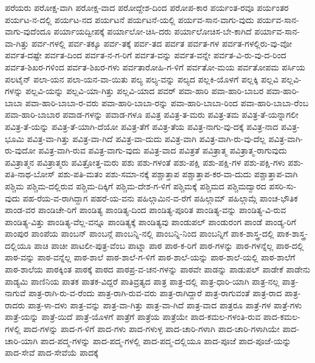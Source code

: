 {ಪರೆಯರು
ಪರೋಕ್ಷ-ವಾಗಿ
ಪರೋಕ್ಷ-ವಾದ
ಪರೋದ್ದೇಶ-ದಿಂದ
ಪರೋಪ-ಕಾರ
ಪರ್ಯಂತ-ರವೂ
ಪರ್ಯಂತರ
ಪರ್ಯಟ-ನ-ದಲ್ಲಿ
ಪರ್ಯಟ-ನದ
ಪರ್ಯಟನೆ
ಪರ್ಯಟನೆ-ಯಲ್ಲಿ
ಪರ್ಯವ-ಸಾನ-ವಾಗು-ವುದು
ಪರ್ಯವ-ಸಾನ-ವಾಗು-ವುದೆಂದೂ
ಪರ್ಯಾಯದ್ವೀಪಕ್ಕೆ
ಪರ್ಯಾಲೋ-ಚಿಸಿ-ದರು
ಪರ್ಯಾಲೋಚಿಸ-ಬೇ-ಕಾಗಿದೆ
ಪರ್ಯಾವ-ಸಾನ-ವಾ-ಗಿತ್ತು
ಪರ್ವ-ಗಳಲ್ಲಿ
ಪರ್ವ-ತಕ್ಕೂ
ಪರ್ವ-ತಕ್ಕೆ
ಪರ್ವ-ತದ
ಪರ್ವತ
ಪರ್ವತ-ಗಳ
ಪರ್ವತ-ಗಳಲ್ಲಿರು-ವು-ವೋ
ಪರ್ವತ-ದಷ್ಟೇ
ಪರ್ವತ-ದಿಂದ
ಪರ್ವತ-ನ-ಗ-ರಿಗೆ
ಪರ್ವತ-ವನ್ನು
ಪರ್ವತ-ವನ್ನೇ
ಪರ್ವತ-ವಿ-ರು-ವು-ದ-ರಿಂದ
ಪರ್ವತ-ಶಿಖರ-ಗಳಿಂದ
ಪರ್ವತ-ಶಿಖರ-ಗಳು
ಪರ್ವತಾರೋಹಿ-ಗ-ಳಿಗೆ
ಪರ್ವತೋ-ಮಯ
ಪರ್ವತೋಪಮ
ಪರ್ಸಿಯ
ಪಲಟೈನ್
ಪಲಾ-ಯನ
ಪಲಾ-ಯನ-ವಾ-ಯಿತು
ಪಲ್ಯ
ಪಲ್ಯ-ವನ್ನು
ಪಲ್ಯದ
ಪಲ್ಲಕಿ-ಯೊಳಗೆ
ಪಲ್ಲಕ್ಕಿ
ಪಲ್ಲವಿ
ಪಲ್ಲವಿ-ಗಳನ್ನು
ಪಲ್ಲವಿ-ಯನ್ನು
ಪಲ್ಲವಿ-ಯಾ-ಗಿತ್ತು
ಪಲ್ಲವಿ-ಯಾದ
ಪವರ್
ಪವಾ-ಹಾರಿ
ಪವಾ-ಹಾರಿ-ಬಾಬರ
ಪವಾ-ಹಾರಿ-ಬಾಬಾ
ಪವಾ-ಹಾರಿ-ಬಾಬಾ-ರ-ವರು
ಪವಾ-ಹಾರಿ-ಬಾಬಾ-ರನ್ನು
ಪವಾ-ಹಾರಿ-ಬಾಬಾ-ರಿಂದ
ಪವಾ-ಹಾರಿ-ಬಾಬಾ-ರೆಂಬ
ಪವಾ-ಹಾರಿ-ಬಾಬಾರ
ಪವಾಡ-ಗಳನ್ನು
ಪವಾಡ-ಗಳೂ
ಪವಿತ್ರ
ಪವಿತ್ರ-ತ-ಮರು
ಪವಿತ್ರ-ತಮ
ಪವಿತ್ರ-ತೆ-ಯನ್ನಾಗಲೀ
ಪವಿತ್ರ-ತೆ-ಯನ್ನು
ಪವಿತ್ರ-ತೆ-ಯಾಗಿ-ದೆಯೋ
ಪವಿತ್ರ-ತೆಗೆ
ಪವಿತ್ರ-ತೆಯ
ಪವಿತ್ರ-ನಾಗು-ವು-ದಕ್ಕೆ
ಪವಿತ್ರ-ನಾದ
ಪವಿತ್ರ-ಭೂಮಿ
ಪವಿತ್ರ-ವಾ-ಗಿತ್ತು
ಪವಿತ್ರ-ವಾ-ಗಿದೆ
ಪವಿತ್ರ-ವಾ-ದುದು
ಪವಿತ್ರ-ವಾಗಿ
ಪವಿತ್ರ-ವಾಗಿ-ರು-ವು-ದೆಲ್ಲ
ಪವಿತ್ರ-ವಾಗಿ-ರು-ವುದೋ
ಪವಿತ್ರ-ವಾಗಿ-ರುವ
ಪವಿತ್ರ-ವಾಗು-ವುದು
ಪವಿತ್ರ-ವಾದ
ಪವಿತ್ರತೆ
ಪವಿತ್ರಾತ್ಮ
ಪವಿತ್ರಾತ್ಮ-ರಾಗುವುದು
ಪವಿತ್ರಾತ್ಮನ
ಪವಿತ್ರಾತ್ಮರು
ಪವಿತ್ರೋತ್ತ-ಮರು
ಪಶು
ಪಶು-ಗಳಂತೆ
ಪಶು-ಪಕ್ಷಿ
ಪಶು-ಪಕ್ಷಿ-ಗಳ
ಪಶು-ಪಕ್ಷಿ-ಗಳು
ಪಶು-ಪತಿ-ನಾಥ-ಬೋಸ್
ಪಶು-ಪತಿ-ಮತಂ
ಪಶು-ಸಮಾ-ನಕ್ಕೆ
ಪಶ್ಚಾತ್ತಾಪ
ಪಶ್ಚಾತ್ತಾಪ-ಕರ-ವಾ-ದುದು
ಪಶ್ಚಾತ್ತಾಪ-ವಾಗಿ
ಪಶ್ಚಿಮ
ಪಶ್ಚಿಮ-ದಲ್ಲಿರುವ
ಪಶ್ಚಿಮ-ದಿಕ್ಕಿಗೆ
ಪಶ್ಚಿಮ-ದೇಶ-ಗ-ಳಿಗೆ
ಪಶ್ಚಿಮಕ್ಕೆ
ಪಶ್ಚಿಮದ
ಪಶ್ಚಿಮದ್ವಾರದ
ಪಸರಿ-ಸು-ವುದು
ಪಹ-ರೆಯ-ವ-ರಾಗಿದ್ದಾಗ
ಪಹರೆ-ಯ-ವನು
ಪಹಿಲ್ಗಾಮಿನ-ವ-ರೆಗೆ
ಪಹಿಲ್ಗಾಮ್
ಪಹಿಲ್ಗಾಮ್ಗೆ
ಪಾಂಚ-ಭೌತಿಕ
ಪಾಂಡ-ವರ
ಪಾಂಡಿಚೇ-ರಿಗೆ
ಪಾಂಡಿತ್ಯ
ಪಾಂಡಿತ್ಯ-ದಿಂದ
ಪಾಂಡಿತ್ಯ-ಪೂರಿತ
ಪಾಂಡಿತ್ಯ-ವನ್ನು
ಪಾಂಡಿತ್ಯ-ವಿ-ರುವ
ಪಾಂಡಿತ್ಯ-ವಿತ್ತು
ಪಾಂಡಿತ್ಯ-ವೆಲ್ಲ-ವನ್ನೂ
ಪಾಂಡಿತ್ಯಕ್ಕೆ
ಪಾಂಡಿತ್ಯವು
ಪಾಂಡುಪಲ್
ಪಾಂಡುರಂಗ
ಪಾಂಡೆ
ಪಾಂಡ್ಯ-ರಿಗೆ
ಪಾಂಪುರ
ಪಾಂಪೆಯ
ಪಾಂಬನ್
ಪಾಂಬನ್ಗೆ
ಪಾಂಬನ್ನಿ-ನಲ್ಲಿ
ಪಾಂಬನ್ನಿ-ನಿಂದ
ಪಾಂಬನ್ನಿಗೆ
ಪಾಕ-ಶಾಸ್ತ್ರ-ದಲ್ಲಿ
ಪಾಕ-ಶಾಸ್ತ್ರ-ದಲ್ಲಿಯೂ
ಪಾಚಿ
ಪಾಚೀ
ಪಾಟಲೀ-ಪುತ್ರ-ವೆಂಬ
ಪಾಟ್ನಾ
ಪಾಠ
ಪಾಠ-ಕ-ರಿಗೆ
ಪಾಠ-ಗಳನ್ನು
ಪಾಠ-ಗಳನ್ನೆಲ್ಲ
ಪಾಠ-ದಲ್ಲಿ
ಪಾಠ-ವನ್ನು
ಪಾಠ-ವನ್ನೆಲ್ಲ
ಪಾಠ-ಶಾಲೆ
ಪಾಠ-ಶಾಲೆ-ಗ-ಳಿಗೆ
ಪಾಠ-ಶಾಲೆ-ಯನ್ನು
ಪಾಠ-ಶಾಲೆ-ಯಲ್ಲಿ
ಪಾಠ-ಶಾಲೆಗೆ
ಪಾಠ-ಶಾಲೆಯ
ಪಾಠಕ್ಕಿಂತ
ಪಾಠಕ್ಕೆ
ಪಾಠದ
ಪಾಠಪ್ರ-ವ-ಚನ-ಗಳನ್ನು
ಪಾಠವೇ
ಪಾಡನ್ನು
ಪಾಡುಪಲ್
ಪಾಡೇಕೆ
ಪಾಡೇನು
ಪಾಡ್ಯಮಿ
ಪಾಣಿನಿಯ
ಪಾತಕ
ಪಾತಕ-ವಿದ್ದರೆ
ಪಾತಿವ್ರತ್ಯದ
ಪಾತ್ರ
ಪಾತ್ರ-ದಲ್ಲಿ
ಪಾತ್ರ-ಧಾರಿ-ಯಾಗಿ
ಪಾತ್ರ-ನಲ್ಲ
ಪಾತ್ರ-ನಾಗುವೆ
ಪಾತ್ರ-ರಾಗಿ-ರು-ವ-ರೆಂದು
ಪಾತ್ರ-ರಾಗಿ-ರುವ-ವರು
ಪಾತ್ರ-ರಾಗಿದ್ದಾರೆ
ಪಾತ್ರ-ರಾಗುವಂತೆ
ಪಾತ್ರ-ರಾದ
ಪಾತ್ರ-ರಾದರು
ಪಾತ್ರ-ಳಾ-ದಳು
ಪಾತ್ರ-ವನ್ನು
ಪಾತ್ರ-ವಾ-ಗಿತ್ತು
ಪಾತ್ರ-ವಾ-ಗಿದೆ
ಪಾತ್ರ-ವಾದ
ಪಾತ್ರರೂ
ಪಾತ್ರೆ-ಗಳ
ಪಾತ್ರೆ-ಗಳು
ಪಾತ್ರೆ-ಯನ್ನು
ಪಾತ್ರೆ-ಯಿದೆ
ಪಾತ್ರೆ-ಯೊಳಗೆ
ಪಾತ್ರೆಗೆ
ಪಾತ್ರೆಯ
ಪಾತ್ರೆಯೇ
ಪಾದ-ಕಮಲ-ಗಳಂತಿ-ರುವ
ಪಾದ-ಕಮಲ-ಗಳಲ್ಲಿ
ಪಾದ-ಗಳನ್ನು
ಪಾದ-ಗ-ಳಿಗೆ
ಪಾದ-ಗಳು
ಪಾದ-ಗಳುಳ್ಳ
ಪಾದ-ಚಾರಿ-ಗಳಾಗಿ
ಪಾದ-ಚಾರಿ-ಗಳಾಗಿಯೇ
ಪಾದ-ಚಾರಿ-ಯಾಗಿ
ಪಾದ-ಪದ್ಮ-ಗಳನ್ನು
ಪಾದ-ಪದ್ಮ-ಗಳಲ್ಲಿ
ಪಾದ-ಪದ್ಮ-ದಲ್ಲಿಯೂ
ಪಾದ-ಪೂಜೆ
ಪಾದ-ಪೂಜೆ-ಯನ್ನು
ಪಾದ-ಸೇವೆ
ಪಾದ-ಸೇವೆಯೆ
ಪಾದಕ್ಕೆ
}
